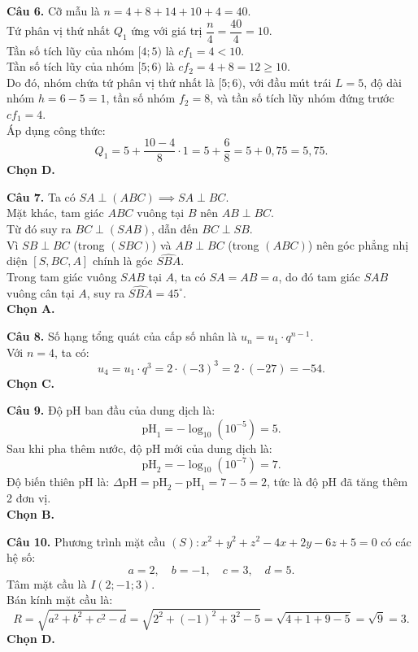 \documentclass[12pt,a4paper]{article}
\begin{document}
\vspace{0.25cm}
\noindent\textbf{Câu 6.} Cỡ mẫu là $n = 4 + 8 + 14 + 10 + 4 = 40$.\\
Tứ phân vị thứ nhất $Q_1$ ứng với giá trị $\dfrac{n}{4} = \dfrac{40}{4} = 10$.\\
Tần số tích lũy của nhóm $[4; 5)$ là $cf_1 = 4 < 10$.\\
Tần số tích lũy của nhóm $[5; 6)$ là $cf_2 = 4 + 8 = 12 \ge 10$.\\
Do đó, nhóm chứa tứ phân vị thứ nhất là $[5; 6)$, với đầu mút trái $L = 5$, độ dài nhóm $h = 6 - 5 = 1$, tần số nhóm $f_2 = 8$, và tần số tích lũy nhóm đứng trước $cf_1 = 4$.\\
Áp dụng công thức:
\[
Q_1 = 5 + \dfrac{10 - 4}{8} \cdot 1 = 5 + \dfrac{6}{8} = 5 + 0{,}75 = 5{,}75.
\]
\textbf{Chọn D.}

\vspace{0.25cm}
\noindent\textbf{Câu 7.} Ta có $SA \perp (ABC) \implies SA \perp BC$.\\
Mặt khác, tam giác $ABC$ vuông tại $B$ nên $AB \perp BC$.\\
Từ đó suy ra $BC \perp (SAB)$, dẫn đến $BC \perp SB$.\\
Vì $SB \perp BC$ (trong $(SBC)$) và $AB \perp BC$ (trong $(ABC)$) nên góc phẳng nhị diện $[S, BC, A]$ chính là góc $\widehat{SBA}$.\\
Trong tam giác vuông $SAB$ tại $A$, ta có $SA = AB = a$, do đó tam giác $SAB$ vuông cân tại $A$, suy ra $\widehat{SBA} = 45^\circ$.\\
\textbf{Chọn A.}

\vspace{0.25cm}
\noindent\textbf{Câu 8.} Số hạng tổng quát của cấp số nhân là $u_n = u_1 \cdot q^{n-1}$.\\
Với $n = 4$, ta có:
\[
u_4 = u_1 \cdot q^3 = 2 \cdot (-3)^3 = 2 \cdot (-27) = -54.
\]
\textbf{Chọn C.}

\vspace{0.25cm}
\noindent\textbf{Câu 9.} Độ pH ban đầu của dung dịch là:
\[
\text{pH}_1 = -\log_{10}(10^{-5}) = 5.
\]
Sau khi pha thêm nước, độ pH mới của dung dịch là:
\[
\text{pH}_2 = -\log_{10}(10^{-7}) = 7.
\]
Độ biến thiên pH là: $\Delta\text{pH} = \text{pH}_2 - \text{pH}_1 = 7 - 5 = 2$, tức là độ pH đã tăng thêm 2 đơn vị.\\
\textbf{Chọn B.}

\vspace{0.25cm}
\noindent\textbf{Câu 10.} Phương trình mặt cầu $(S): x^2 + y^2 + z^2 - 4x + 2y - 6z + 5 = 0$ có các hệ số:
\[
a = 2,\quad b = -1,\quad c = 3,\quad d = 5.
\]
Tâm mặt cầu là $I(2; -1; 3)$.\\
Bán kính mặt cầu là:
\[
R = \sqrt{a^2 + b^2 + c^2 - d} = \sqrt{2^2 + (-1)^2 + 3^2 - 5} = \sqrt{4 + 1 + 9 - 5} = \sqrt{9} = 3.
\]
\textbf{Chọn D.}
\end{document}

